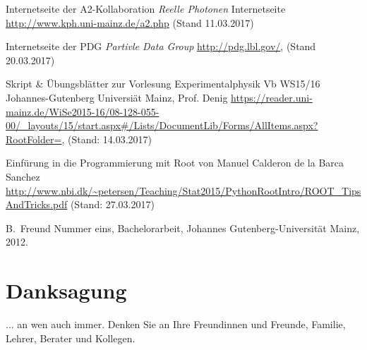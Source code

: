 \documentclass[a4paper,11pt,oneside,final,german,openbib,pdftex]{scrbook}
\begin{document}
\begin{appendix}
\begin{thebibliography}{99}
 Internetseite der A2-Kollaboration {\em Reelle Photonen}
Internetseite \url{http://www.kph.uni-mainz.de/a2.php} (Stand 11.03.2017)

 Internetseite der PDG {\em Partivle Data Group} \url{http://pdg.lbl.gov/}, (Stand 20.03.2017)

 Skript \& Übungsblätter zur Vorlesung Experimentalphysik Vb WS15/16 Johannes-Gutenberg Universi\"at Mainz, Prof. Denig \url{https://reader.uni-mainz.de/WiSe2015-16/08-128-055-00/_layouts/15/start.aspx#/Lists/DocumentLib/Forms/AllItems.aspx?RootFolder=}, (Stand: 14.03.2017)

 Einf\"urung in die Programmierung mit Root von Manuel Calderon de la Barca Sanchez \url{http://www.nbi.dk/~petersen/Teaching/Stat2015/PythonRootIntro/ROOT_TipsAndTricks.pdf} (Stand: 27.03.2017)








  B.~Freund Nummer eins, 
  Bachelorarbeit, Johannes Gutenberg-Universit\"at Mainz, 2012.

\end{thebibliography}

\chapter{Danksagung}

... an wen auch immer. Denken Sie an Ihre Freundinnen und Freunde, 
Familie, Lehrer, Berater und Kollegen.

\end{appendix}
\end{document}
